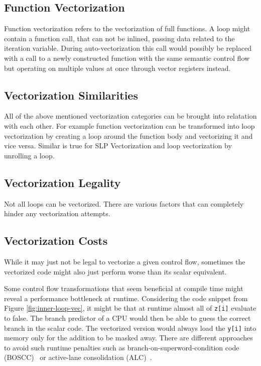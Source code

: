 \documentclass[sigplan,11pt,nonacm]{acmart}
\begin{document}
\subsection{Function Vectorization}
Function vectorization refers to the vectorization of full functions. A loop might contain a
function call, that can not be inlined, passing data related to the iteration variable. During
auto-vectorization this call would possibly be replaced with a call to a newly constructed function 
with the same semantic control flow but operating on multiple values at once through vector
registers instead.

\subsection{Vectorization Similarities}
All of the above mentioned vectorization categories can be brought into relatation with each other. 
For example function vectorization can be transformed into loop vectorization by creating a loop 
around the function body and vectorizing it and vice versa. Similar is true for SLP Vectorization 
and loop vectorization by unrolling a loop.
 
\subsection{Vectorization Legality}
Not all loops can be vectorized. There are various factors that can completely hinder any
vectorization attempts.


\subsection{Vectorization Costs}
While it may just not be legal to vectorize a given control flow, sometimes the vectorized code 
might also just perform worse than its scalar equivalent.

Some control flow transformations that seem beneficial at compile time might reveal a performance
bottleneck at runtime. Considering the code snippet from Figure \ref{fig:inner-loop-vec}, it might
be that at runtime almost all of \texttt{z[i]} evaluate to false. The branch predictor of a CPU
would then be able to guess the correct branch in the scalar code. The vectorized version would
always load the \texttt{y[i]} into memory only for the addition to be masked away. There are
different approaches to avoid such runtime penalties such as branch-on-superword-condition code 
(BOSCC)~\cite{10.5555/1299042.1299055,llvmboscc} or active-lane 
consolidation (ALC)~\cite{10.1007/s11227-022-04359-w,10.5555/3615924.3615932}.
\end{document}

